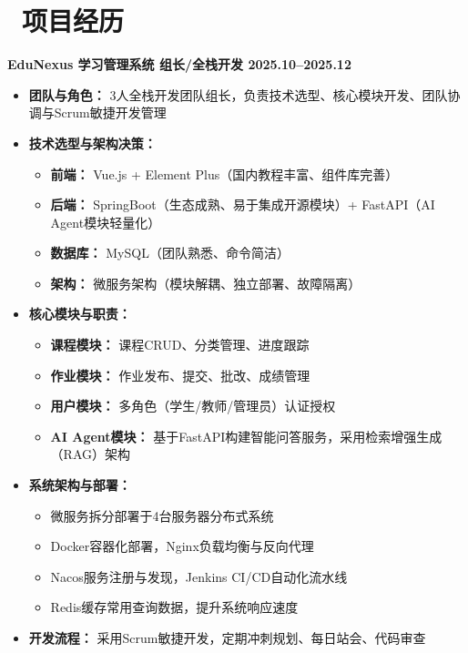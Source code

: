 \documentclass[11pt]{article}
\begin{document}
\section{\makebox[\widthof{\faGraduationCap}][c]{\color{CVBlue}\faUsers}\ 项目经历}
\textbf{EduNexus 学习管理系统 \hfill 组长/全栈开发 \hfill 2025.10--2025.12}
\begin{itemize}
    \item \textbf{团队与角色：} 3人全栈开发团队组长，负责技术选型、核心模块开发、团队协调与Scrum敏捷开发管理

    \item \textbf{技术选型与架构决策：}
    \begin{itemize}
        \item \textbf{前端：} Vue.js + Element Plus（国内教程丰富、组件库完善）
        \item \textbf{后端：} SpringBoot（生态成熟、易于集成开源模块）+ FastAPI（AI Agent模块轻量化）
        \item \textbf{数据库：} MySQL（团队熟悉、命令简洁）
        \item \textbf{架构：} 微服务架构（模块解耦、独立部署、故障隔离）
    \end{itemize}

    \item \textbf{核心模块与职责：}
    \begin{itemize}
        \item \textbf{课程模块：} 课程CRUD、分类管理、进度跟踪
        \item \textbf{作业模块：} 作业发布、提交、批改、成绩管理
        \item \textbf{用户模块：} 多角色（学生/教师/管理员）认证授权
        \item \textbf{AI Agent模块：} 基于FastAPI构建智能问答服务，采用检索增强生成（RAG）架构
    \end{itemize}

    \item \textbf{系统架构与部署：}
    \begin{itemize}
        \item 微服务拆分部署于4台服务器分布式系统
        \item Docker容器化部署，Nginx负载均衡与反向代理
        \item Nacos服务注册与发现，Jenkins CI/CD自动化流水线
        \item Redis缓存常用查询数据，提升系统响应速度
    \end{itemize}

    \item \textbf{开发流程：} 采用Scrum敏捷开发，定期冲刺规划、每日站会、代码审查
\end{itemize}
\end{document}
